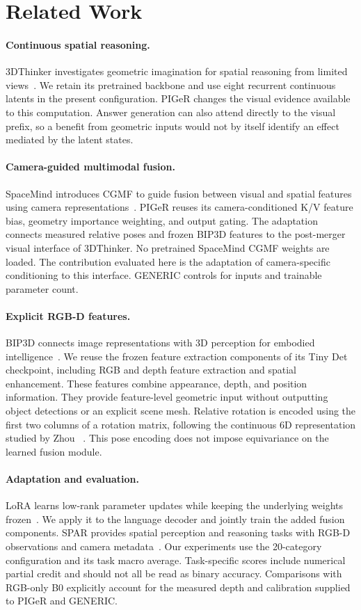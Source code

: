 \section{Related Work}
\label{sec:related}
\paragraph{Continuous spatial reasoning.}
3DThinker investigates geometric imagination for spatial reasoning from limited views~\cite{thinker}. We retain its pretrained backbone and use eight recurrent continuous latents in the present configuration. PIGeR changes the visual evidence available to this computation. Answer generation can also attend directly to the visual prefix, so a benefit from geometric inputs would not by itself identify an effect mediated by the latent states.

\paragraph{Camera-guided multimodal fusion.}
SpaceMind introduces CGMF to guide fusion between visual and spatial features using camera representations~\cite{spacemind}. PIGeR reuses its camera-conditioned K/V feature bias, geometry importance weighting, and output gating. The adaptation connects measured relative poses and frozen BIP3D features to the post-merger visual interface of 3DThinker. No pretrained SpaceMind CGMF weights are loaded. The contribution evaluated here is the adaptation of camera-specific conditioning to this interface. GENERIC controls for inputs and trainable parameter count.

\paragraph{Explicit RGB-D features.}
BIP3D connects image representations with 3D perception for embodied intelligence~\cite{bip3d}. We reuse the frozen feature extraction components of its Tiny Det checkpoint, including RGB and depth feature extraction and spatial enhancement. These features combine appearance, depth, and position information. They provide feature-level geometric input without outputting object detections or an explicit scene mesh. Relative rotation is encoded using the first two columns of a rotation matrix, following the continuous 6D representation studied by Zhou \etal~\cite{rotation}. This pose encoding does not impose equivariance on the learned fusion module.

\paragraph{Adaptation and evaluation.}
LoRA learns low-rank parameter updates while keeping the underlying weights frozen~\cite{lora}. We apply it to the language decoder and jointly train the added fusion components. SPAR provides spatial perception and reasoning tasks with RGB-D observations and camera metadata~\cite{spar}. Our experiments use the 20-category configuration and its task macro average. Task-specific scores include numerical partial credit and should not all be read as binary accuracy. Comparisons with RGB-only B0 explicitly account for the measured depth and calibration supplied to PIGeR and GENERIC.
